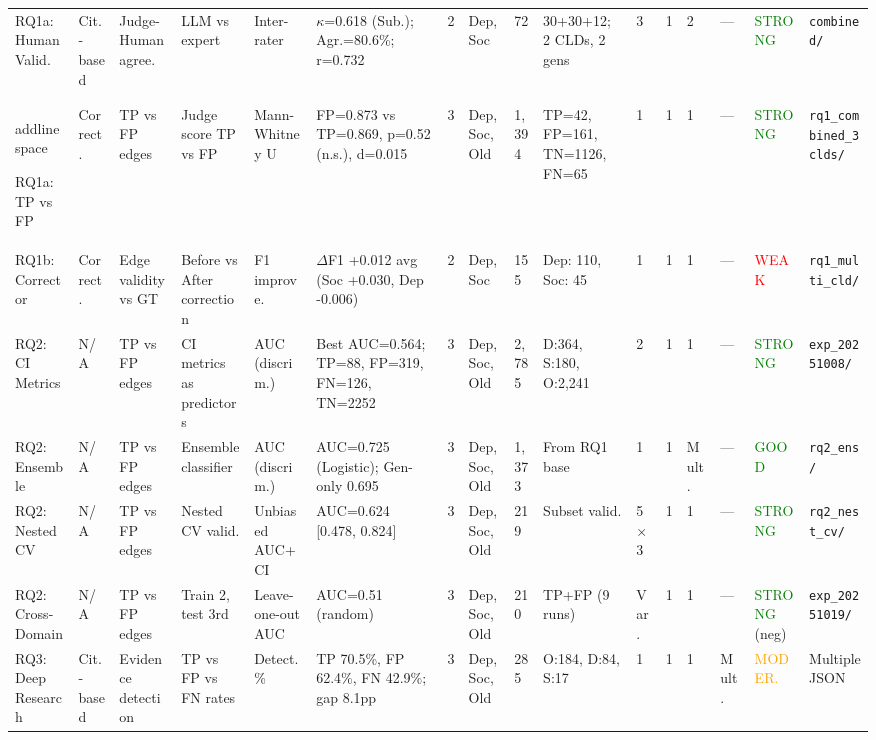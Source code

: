 \documentclass{article}
\begin{document}
\begin{landscape}
{\begin{longtable}{@{}p{1.8cm}p{1.2cm}p{1.5cm}p{1.8cm}p{1.2cm}p{2.8cm}p{0.5cm}p{1.5cm}p{1cm}p{2cm}p{0.6cm}p{0.6cm}p{0.8cm}p{1.5cm}p{1.2cm}p{2cm}@{}}
RQ1a: Human Valid. & Cit.-based & Judge-Human agree. & LLM vs expert & Inter-rater & $\kappa$=0.618 (Sub.); Agr.=80.6\%; r=0.732 & 2 & Dep,Soc & 72 & 30+30+12; 2 CLDs, 2 gens & 3 & 1 & 2 & --- & \textcolor{green}{STRONG} & \texttt{combined/} \\\\
\\addlinespace

RQ1a: TP vs FP & Correct. & TP vs FP edges & Judge score TP vs FP & Mann-Whitney U & FP=0.873 vs TP=0.869, p=0.52 (n.s.), d=0.015 & 3 & Dep,Soc,Old & 1,394 & TP=42, FP=161, TN=1126, FN=65 & 1 & 1 & 1 & --- & \textcolor{green}{STRONG} & \texttt{rq1\_combined\_3clds/} \\
\addlinespace

RQ1b: Corrector & Correct. & Edge validity vs GT & Before vs After correction & F1 improve. & $\Delta$F1 +0.012 avg (Soc +0.030, Dep -0.006) & 2 & Dep, Soc & 155 & Dep: 110, Soc: 45 & 1 & 1 & 1 & --- & \textcolor{red}{WEAK} & \texttt{rq1\_multi\_cld/} \\
\addlinespace

RQ2: CI Metrics & N/A & TP vs FP edges & CI metrics as predictors & AUC (discrim.) & Best AUC=0.564; TP=88, FP=319, FN=126, TN=2252 & 3 & Dep,Soc,Old & 2,785 & D:364, S:180, O:2,241 & 2 & 1 & 1 & --- & \textcolor{green}{STRONG} & \texttt{exp\_20251008/} \\
\addlinespace

RQ2: Ensemble & N/A & TP vs FP edges & Ensemble classifier & AUC (discrim.) & AUC=0.725 (Logistic); Gen-only 0.695 & 3 & Dep,Soc,Old & 1,373 & From RQ1 base & 1 & 1 & Mult. & --- & \textcolor{green}{GOOD} & \texttt{rq2\_ens/} \\
\addlinespace

RQ2: Nested CV & N/A & TP vs FP edges & Nested CV valid. & Unbiased AUC+CI & AUC=0.624 [0.478, 0.824] & 3 & Dep,Soc,Old & 219 & Subset valid. & 5×3 & 1 & 1 & --- & \textcolor{green}{STRONG} & \texttt{rq2\_nest\_cv/} \\
\addlinespace

RQ2: Cross-Domain & N/A & TP vs FP edges & Train 2, test 3rd & Leave-one-out AUC & AUC=0.51 (random) & 3 & Dep,Soc,Old & 210 & TP+FP (9 runs) & Var. & 1 & 1 & --- & \textcolor{green}{STRONG} (neg) & \texttt{exp\_20251019/} \\
\addlinespace

RQ3: Deep Research & Cit.-based & Evidence detection & TP vs FP vs FN rates & Detect. \% & TP 70.5\%, FP 62.4\%, FN 42.9\%; gap 8.1pp & 3 & Dep,Soc,Old & 285 & O:184, D:84, S:17 & 1 & 1 & 1 & Mult. & \textcolor{orange}{MODER.} & Multiple JSON \\


\end{longtable}}
\end{landscape}
\end{document}
